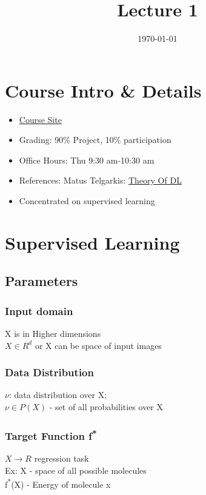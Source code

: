 \documentclass[11pt]{article}
\date{\today}
\title{Lecture 1}
\begin{document}
\maketitle
\section{Course Intro \& Details}
\label{sec:org5a49e8b}
\begin{itemize}
\item \href{https://www.notion.so/Mathematics-of-Deep-Learning-05cd9255f03842489083ec7cbb6338d5}{Course Site}\\
\item Grading: 90\% Project, 10\% participation\\
\item Office Hours: Thu 9:30 am-10:30 am\\
\item References: Matus Telgarkis: \href{https://mjt.cs.illinois.edu/courses/dlt-f20/}{Theory Of DL}\\
\item Concentrated on supervised learning\\
\end{itemize}

\section{Supervised Learning}
\label{sec:org7791145}
\subsection{Parameters}
\label{sec:org276dcb8}
\subsubsection{Input domain}
\label{sec:org93f6ce1}
  X is in Higher dimensions\\
\(X \in R^d\) or X can be space of input images\\
\subsubsection{Data Distribution}
\label{sec:org1e3fbac}
\(\nu\): data distribution over X;\\
\(\nu \in P(X)\) - set of all probabilities over X\\
\subsubsection{Target Function f\textsuperscript{*}}
\label{sec:org52826d3}
\(X \to R\) regression task\\
Ex: X      - space of all possible molecules\\
    f\textsuperscript{*}(X) - Energy of molecule x\\
\end{document}
